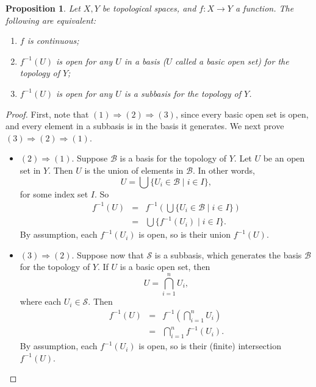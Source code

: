 \documentclass[12pt]{article}
\newtheorem{prop}{Proposition}
\begin{document}
\begin{prop} Let $X,Y$ be topological spaces, and $f:X\to Y$ a function.  The following are equivalent:
\begin{enumerate}
\item $f$ is continuous;
\item $f^{-1}(U)$ is open for any $U$ in a basis ($U$ called a basic open set) for the topology of $Y$;
\item $f^{-1}(U)$ is open for any $U$ is a subbasis for the topology of $Y$.
\end{enumerate}
\end{prop}

\begin{proof}
First, note that $(1)\Rightarrow (2)\Rightarrow (3)$, since every basic open set is open, and every element in a subbasis is in the basis it generates.  We next prove $(3)\Rightarrow (2)\Rightarrow (1)$.
\begin{itemize}
\item $(2)\Rightarrow (1)$.  Suppose $\mathcal{B}$ is a basis for the topology of $Y$.  Let $U$ be an open set in $Y$.  Then $U$ is the union of elements in $\mathcal{B}$.  In other words, $$U=\bigcup \lbrace U_i \in \mathcal{B} \mid i\in I\rbrace,$$ for some index set $I$.  So 
\begin{eqnarray*}
f^{-1}(U) &=& f^{-1}(\bigcup \lbrace U_i \in \mathcal{B} \mid i\in I\rbrace ) \\
&=& \bigcup \lbrace f^{-1}(U_i) \mid i \in I\rbrace.
\end{eqnarray*}
By assumption, each $f^{-1}(U_i)$ is open, so is their union $f^{-1}(U)$.
\item $(3)\Rightarrow (2)$.  Suppose now that $\mathcal{S}$ is a subbasis, which generates the basis $\mathcal{B}$ for the topology of $Y$.  If $U$ is a basic open set, then $$U=\bigcap_{i=1}^n U_i,$$ where each $U_i \in \mathcal{S}$.  Then 
\begin{eqnarray*}
f^{-1}(U) &=& f^{-1}(\bigcap_{i=1}^n U_i ) \\
&=& \bigcap_{i=1}^n f^{-1}(U_i).
\end{eqnarray*}
By assumption, each $f^{-1}(U_i)$ is open, so is their (finite) intersection $f^{-1}(U)$.
\end{itemize}
\end{proof}
\end{document}
